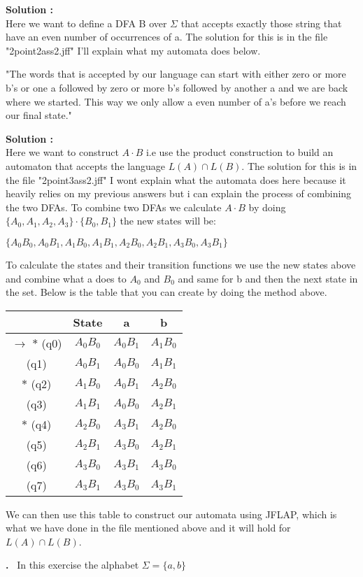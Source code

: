 \documentclass{article}
\newcounter{problem}
\newcounter{solution}
\newcommand\Problem{%
  \stepcounter{problem}%
  \textbf{\theproblem.}~%
  \setcounter{solution}{0}%
}
\newcommand\ASolution{%
  \stepcounter{solution}%
  \textbf{Solution \thesolution:}\\%
}
\begin{document}
\ASolution Here we want to define a DFA B over $\Sigma$ that 
accepts exactly those string that have an even number of 
occurrences of a. The solution for this is in the file 
"2point2ass2.jff" I'll explain what my automata does below.

\begin{center}
    "The words that is accepted by our language can start with 
    either zero or more b's or one a followed by zero or more 
    b's followed by another a and we are back where we started.
    This way we only allow a even number of a's before we reach
    our final state." 
\end{center}
\newpage
\ASolution Here we want to construct $A \cdot B$ i.e use the product construction to 
build an automaton that accepts the language $L(A) \cap L(B)$. The solution for this 
is in the file "2point3ass2.jff" I wont explain what the automata does here because 
it heavily relies on my previous answers but i can explain the process of combining 
the two DFAs. To combine two DFAs we calculate $A \cdot B$ by doing 
$\{A_0,A_1,A_2,A_3\} \cdot \{B_0,B_1\}$ the new states will be:
\begin{center}
    $\{A_0B_0,A_0B_1,A_1B_0,A_1B_1,A_2B_0,A_2B_1,A_3B_0,A_3B_1\}$
\end{center}

To calculate the states and their transition functions we use the new states 
above and combine what a does to $A_0$ and $B_0$ and same for b and then the 
next state in the set. Below is the table that you can create by doing the 
method above.

\begin{table}[h!]
\centering
 \begin{tabular}{||c c c c||} 
 \hline
 & State & a & b \\ [0.5ex] 
 \hline\hline
 $\rightarrow$ $*$ (q0) & $A_0B_0$ & $A_0B_1$ & $A_1B_0$ \\ 
    \hfill          (q1) & $A_0B_1$ & $A_0B_0$ & $A_1B_1$ \\
    \hfill $*$ (q2) & $A_1B_0$ & $A_0B_1$ & $A_2B_0$ \\
    \hfill           (q3) & $A_1B_1$ & $A_0B_0$ & $A_2B_1$\\
    \hfill $*$ (q4) & $A_2B_0$ & $A_3B_1$ & $A_2B_0$ \\
    \hfill           (q5) & $A_2B_1$ & $A_3B_0$ & $A_2B_1$ \\
    \hfill           (q6) & $A_3B_0$ & $A_3B_1$ & $A_3B_0$ \\
    \hfill           (q7) & $A_3B_1$ & $A_3B_0$ & $A_3B_1$ \\[1ex] 
 \hline
 \end{tabular}
\end{table}
\begin{center}
  We can then use this table to construct our automata using JFLAP, which is what we have done in the file mentioned above and it will hold for $L(A) \cap L(B)$.
\end{center} 
\newpage
\Problem In this exercise the alphabet $\Sigma = \{a,b\}$
\end{document}
